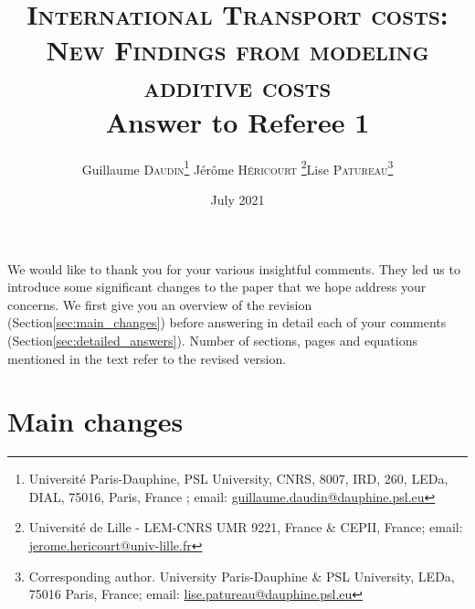 \documentclass[a4paper,12pt]{article}
\begin{document}
\title{\textsc{International Transport costs:\\New Findings from modeling additive costs} \\
Answer to Referee 1}

\author{Guillaume \textsc{Daudin}\thanks{%
Université Paris-Dauphine, PSL University, CNRS, 8007, IRD, 260, LEDa, DIAL, 75016, Paris, France ; email: \url{guillaume.daudin@dauphine.psl.eu}}  \qquad J\'{e}r\^{o}me \textsc{H\'{e}ricourt} \thanks{Universit\'{e} de Lille - LEM-CNRS UMR 9221, France \& CEPII, France; email: \url{jerome.hericourt@univ-lille.fr}}\qquad Lise \textsc{Patureau}\thanks{Corresponding author.
University Paris-Dauphine \& PSL University, LEDa, 75016 Paris, France;  email: \url{lise.patureau@dauphine.psl.eu} } }


\date{July 2021}
 \maketitle
\bigskip

We would like to thank you for your various insightful comments. They led us to introduce some
significant changes to the paper that we hope address your concerns. We first give you an overview
of the revision (Section\ref{sec:main_changes}) before answering in detail each of your comments (Section\ref{sec:detailed_answers}). Number of sections, pages and equations mentioned in the text refer to the revised version.

\section{Main changes \label{sec:main_changes}}
\end{document}

